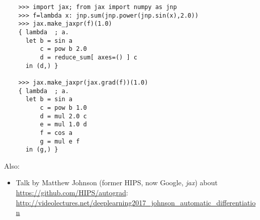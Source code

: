 \documentclass[paper=a4,11pt,headsepline]{scrartcl}
\newcommand{\soft}[1]{\textsl{#1}\xspace}
\newcommand{\jax}{\soft{jax}}
\begin{document}
\begin{verbatim}
    >>> import jax; from jax import numpy as jnp
    >>> f=lambda x: jnp.sum(jnp.power(jnp.sin(x),2.0))
    >>> jax.make_jaxpr(f)(1.0)
    { lambda  ; a.
      let b = sin a
          c = pow b 2.0
          d = reduce_sum[ axes=() ] c
      in (d,) }

    >>> jax.make_jaxpr(jax.grad(f))(1.0)
    { lambda  ; a.
      let b = sin a
          c = pow b 1.0
          d = mul 2.0 c
          e = mul 1.0 d
          f = cos a
          g = mul e f
      in (g,) }
\end{verbatim}





Also:

\begin{itemize}
    \item Talk by Matthew Johnson (former HIPS, now Google, \jax) about
        \url{https://github.com/HIPS/autograd}:
        \url{http://videolectures.net/deeplearning2017_johnson_automatic_differentiation}
\end{itemize}
\end{document}
